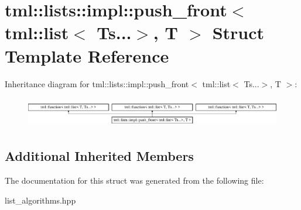 \hypertarget{structtml_1_1lists_1_1impl_1_1push__front_3_01tml_1_1list_3_01Ts_8_8_8_4_00_01T_01_4}{\section{tml\+:\+:lists\+:\+:impl\+:\+:push\+\_\+front$<$ tml\+:\+:list$<$ Ts...$>$, T $>$ Struct Template Reference}
\label{structtml_1_1lists_1_1impl_1_1push__front_3_01tml_1_1list_3_01Ts_8_8_8_4_00_01T_01_4}
}
Inheritance diagram for tml\+:\+:lists\+:\+:impl\+:\+:push\+\_\+front$<$ tml\+:\+:list$<$ Ts...$>$, T $>$\+:\begin{figure}[H]
\begin{center}
\leavevmode
\includegraphics[height=1.352657cm]{structtml_1_1lists_1_1impl_1_1push__front_3_01tml_1_1list_3_01Ts_8_8_8_4_00_01T_01_4}
\end{center}
\end{figure}
\subsection*{Additional Inherited Members}


The documentation for this struct was generated from the following file\+:\begin{DoxyCompactItemize}
\item 
list\+\_\+algorithms.\+hpp\end{DoxyCompactItemize}
